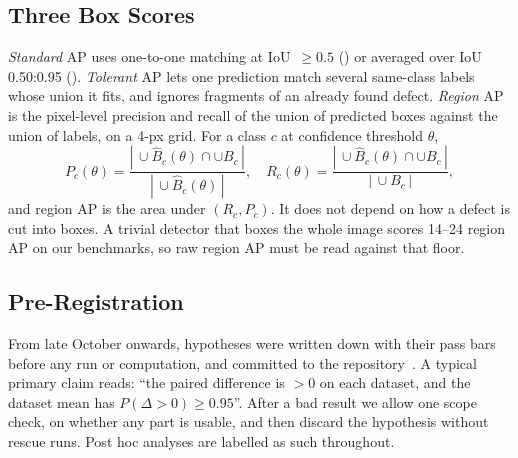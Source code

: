 \subsection{Three Box Scores}
\textit{Standard} AP uses one-to-one matching at IoU~$\geq 0.5$ (\apfifty) or averaged over IoU 0.50:0.95 (\mcoco). \textit{Tolerant} AP lets one prediction match several same-class labels whose union it fits, and ignores fragments of an already found defect. \textit{Region} AP is the pixel-level precision and recall of the union of predicted boxes against the union of labels, on a 4-px grid. For a class $c$ at confidence threshold $\theta$,
\begin{equation}
P_c(\theta)=\frac{|\,\cup\hat{B}_c(\theta)\cap\cup B_c\,|}{|\,\cup\hat{B}_c(\theta)\,|},\quad
R_c(\theta)=\frac{|\,\cup\hat{B}_c(\theta)\cap\cup B_c\,|}{|\,\cup B_c\,|},
\label{eq:region}
\end{equation}
and region AP is the area under $(R_c,P_c)$. It does not depend on how a defect is cut into boxes. A trivial detector that boxes the whole image scores 14--24 region AP on our benchmarks, so raw region AP must be read against that floor.

\subsection{Pre-Registration}
From late October onwards, hypotheses were written down with their pass bars before any run or computation, and committed to the repository~\cite{prereg,repo}. A typical primary claim reads: ``the paired difference is $>0$ on each dataset, and the dataset mean has $P(\Delta>0)\geq0.95$''. After a bad result we allow one scope check, on whether any part is usable, and then discard the hypothesis without rescue runs. Post hoc analyses are labelled as such throughout.
